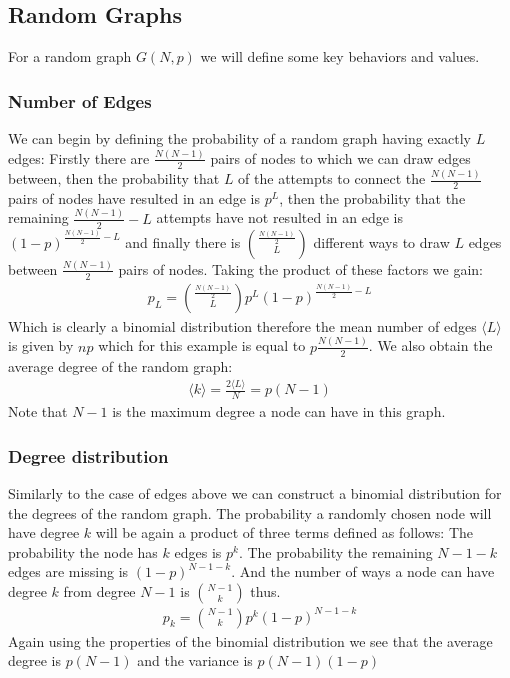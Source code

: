 \documentclass{article}
\begin{document}
        \subsection{Random Graphs}
        For a random graph $G(N,p)$ we will define some key behaviors and values.
            \subsubsection{Number of Edges}
            We can begin by defining the probability of a random graph having exactly $L$ edges:
            Firstly there are $\frac{N(N-1)}{2}$ pairs of nodes to which we can draw edges between, then the probability that $L$ of the attempts to connect the $\frac{N(N-1)}{2}$ pairs of nodes have resulted in an edge is $p^L$, then the probability that the remaining  $\frac{N(N-1)}{2} -L$ attempts have not resulted in an edge is $(1-p)^{\frac{N(N-1)}{2} -L}$ and finally there is $\binom{\frac{N(N-1)}{2}}{L}$ different ways to draw $L$ edges between $\frac{N(N-1)}{2}$ pairs of nodes. Taking the product of these factors we gain:
            \begin{align*}
                p_{L} = \binom{\frac{N(N-1)}{2}}{L}p^L(1-p)^{\frac{N(N-1)}{2} -L}
            \end{align*}
            Which is clearly a binomial distribution therefore the mean number of edges $\langle L \rangle$ is given by $np$ which for this example is equal to $p\frac{N(N-1)}{2}$. We also obtain the average degree of the random graph:
            \begin{align*}
                \langle k \rangle = \frac{2 \langle L \rangle}{N} = p(N-1)
            \end{align*}
            Note that $N-1$ is the maximum degree a node can have in this graph.
            \subsubsection{Degree distribution}
            Similarly to the case of edges above we can construct a binomial distribution for the degrees of the random graph. The probability a randomly chosen node will have degree $k$ will be again a product of three terms defined as follows: The probability the node has $k$ edges is $p^k$. The probability the remaining $N-1-k$ edges are missing is $(1-p)^{N-1-k}$. And the number of ways a node can have degree $k$ from degree $N-1$ is $\binom{N-1}{k}$ thus.
            \begin{align*}
                p_{k} = \binom{N-1}{k}p^k(1-p)^{N-1-k}
            \end{align*}  
            Again using the properties of the binomial distribution we see that the average degree is $p(N-1)$ and the variance is $p(N-1)(1-p)$
\end{document}
